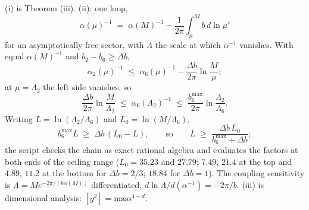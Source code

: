 (i) is Theorem (iii). (ii): one loop,
\[
\alpha(\mu)^{-1} \;=\; \alpha(M)^{-1} - \frac{1}{2\pi}\int_{\mu}^{M} b\,d\ln\mu'
\]
for an asymptotically free sector, with $\Lambda$ the scale at which $\alpha^{-1}$ vanishes. With equal $\alpha(M)^{-1}$ and $b_{2} - b_{6} \geq \Delta b$,
\[
\alpha_{2}(\mu)^{-1} \;\leq\; \alpha_{6}(\mu)^{-1} - \frac{\Delta b}{2\pi}\ln\frac{M}{\mu};
\]
at $\mu = \Lambda_{2}$ the left side vanishes, so
\[
\frac{\Delta b}{2\pi}\ln\frac{M}{\Lambda_{2}} \;\leq\; \alpha_{6}(\Lambda_{2})^{-1} \;\leq\; \frac{b_{6}^{\max}}{2\pi}\ln\frac{\Lambda_{2}}{\Lambda_{6}}.
\]
Writing $L = \ln(\Lambda_{2}/\Lambda_{6})$ and $L_{0} = \ln(M/\Lambda_{6})$,
\[
b_{6}^{\max}L \;\geq\; \Delta b\,(L_{0} - L), \qquad\text{so}\qquad L \;\geq\; \frac{\Delta b\,L_{0}}{b_{6}^{\max} + \Delta b};
\]
the script checks the chain as exact rational algebra and evaluates the factors at both ends of the ceiling range ($L_{0} = 35.23$ and $27.79$; $7.49$, $21.4$ at the top and $4.89$, $11.2$ at the bottom for $\Delta b = 2/3$; $18.84$ for $\Delta b = 1$). The coupling sensitivity is $\Lambda = M e^{-2\pi/(b\alpha(M))}$ differentiated, $d\ln\Lambda/d(\alpha^{-1}) = -2\pi/b$. (iii) is dimensional analysis: $[g^{2}] = \text{mass}^{4-d}$.
